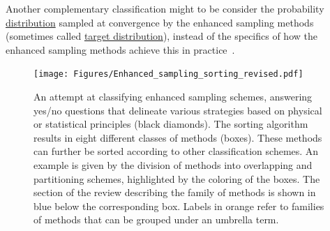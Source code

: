 \documentclass[9pt,review]{livecoms}
\begin{document}
Another complementary classification might to be consider the probability \hyperlink{ref:Distribution} {distribution} sampled at convergence by the enhanced sampling methods (sometimes called \hyperlink{ref:targetdist}{target distribution}), instead of the specifics of how the enhanced sampling methods achieve this in practice~\cite{invernizzi2020unified}.





\begin{figure}[!htb]
\texttt{[image: Figures/Enhanced\_sampling\_sorting\_revised.pdf]}
  \caption{An attempt at classifying enhanced sampling schemes, answering yes/no questions that delineate various strategies based on physical or statistical principles (black diamonds). The sorting algorithm results in eight different classes of methods (boxes). These methods can further be sorted according to other classification schemes. An example is given by the division of methods into overlapping and partitioning schemes, highlighted by the coloring of the boxes. The section of the review describing the family of methods is shown in blue below the corresponding box. Labels in orange refer to families of methods that can be grouped under an umbrella term.}
  \label{fig:scheme}
\end{figure}
\end{document}

